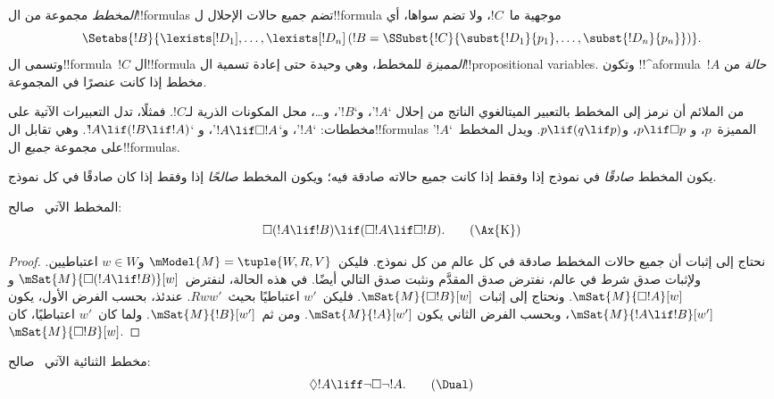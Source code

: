 \documentclass[../../../include/open-logic-section]{subfiles}
\begin{document}


\begin{defn}
  \emph{المخطط} مجموعة من ال!!{formula}s تضم جميع حالات الإحلال
  ل!!{formula} موجهية ما~$!C$، ولا تضم سواها، أي
  \[
  \Setabs{!B}{\lexists[!D_1], \dots, \lexists[!D_n] \left(!B =
  \SSubst{!C}{\subst{!D_1}{p_1}, \dots, \subst{!D_n}{p_n}} \right) }.
  \]
  وتسمى ال!!{formula}~$!C$ ال!!{formula} \emph{المميزة} للمخطط، وهي
  وحيدة حتى إعادة تسمية ال!!{propositional variable}s. وتكون
  !!^a{formula}~$!A$ \emph{حالة} من مخطط إذا كانت عنصرًا في المجموعة.
\end{defn}

من الملائم أن نرمز إلى المخطط بالتعبير الميتالغوي الناتج من إحلال
`$!A$'، و`$!B$'، و\dots، محل المكونات الذرية لـ$!C$. فمثلًا، تدل
التعبيرات الآتية على مخططات: `$!A$'، و`$!A \lif \Box!A$'، و
`$!A \lif (!B \lif !A)$'. وهي تقابل ال!!{formula}s المميزة~$p$، و
$p \lif \Box p$، و$p \lif (q \lif p)$. ويدل المخطط~`$!A$' على
مجموعة \emph{جميع} ال!!{formula}s.

\begin{defn}
  يكون المخطط \emph{صادقًا} في نموذج إذا وفقط إذا كانت جميع حالاته
  صادقة فيه؛ ويكون المخطط \emph{صالحًا} إذا وفقط إذا كان صادقًا في كل
  نموذج.
\end{defn}

\begin{prop}
  المخطط الآتي~ صالح:
  \begin{equation*}
  \Box(!A \lif !B) \lif (\Box !A \lif \Box !B). \tag{\Ax{K}}
  \end{equation*}
\end{prop}

\begin{proof}
  نحتاج إلى إثبات أن جميع حالات المخطط صادقة في كل عالم من كل نموذج.
  فليكن~$\mModel{M} = \tuple{W,R,V}$ و$w \in W$ اعتباطيين. ولإثبات
  صدق شرط في عالم، نفترض صدق المقدَّم ونثبت صدق التالي أيضًا. في هذه
  الحالة، لنفترض~$\mSat{M}{\Box(!A \lif !B)}[w]$ و
  $\mSat{M}{\Box !A}[w]$. ونحتاج إلى إثبات~$\mSat{M}{\Box !B}[w]$.
  فليكن~$w'$ اعتباطيًا بحيث~$Rww'$. عندئذ، بحسب الفرض الأول، يكون
  $\mSat{M}{!A \lif !B}[w']$، وبحسب الفرض الثاني يكون
  $\mSat{M}{!A}[w']$. ومن ثم~$\mSat{M}{!B}[w']$. ولما كان~$w'$
  اعتباطيًا، كان~$\mSat{M}{\Box !B}[w]$.
\end{proof}

\begin{prop}
  مخطط الثنائية الآتي~\Dual{} صالح:
  \begin{equation*}
  \Diamond !A \liff \lnot\Box\lnot !A. \tag{\Dual}
  \end{equation*}
\end{prop}
\end{document}
